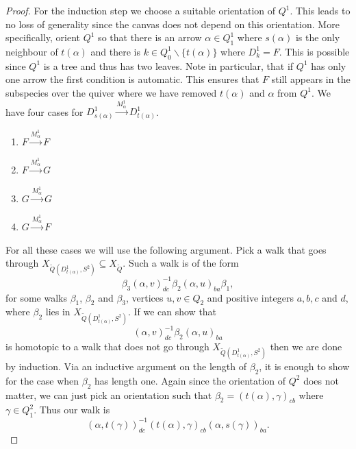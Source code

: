 \documentclass[a4paper, reqno]{amsart}
\theoremstyle{definition}
\begin{document}
\begin{proof}
	For the induction step we choose a suitable orientation of $Q^1$. This leads to no loss of generality since the canvas does not depend on this orientation. More specifically, orient $Q^1$ so that there is an arrow $\alpha\in Q^1_1$ where $s(\alpha)$ is the only neighbour of $t(\alpha)$ and there is $k\in Q_0^1\backslash \{t(\alpha)\}$ where $D_k^1 = F$. This is possible since $Q^1$ is a tree and thus has two leaves. Note in particular, that if $Q^1$ has only one arrow the first condition is automatic. This ensures that $F$ still appears in the subspecies over the quiver where we have removed $t(\alpha)$ and $\alpha$ from $Q^1$. We have four cases for $D_{s(\alpha)}^1\xrightarrow{M_\alpha^1}D_{t(\alpha)}^1$.
	\begin{enumerate}[label=(\alph*)]
		\item $F\xrightarrow{M_\alpha^1}F$
		\item $F\xrightarrow{M_\alpha^1}G$
		\item $G\xrightarrow{M_\alpha^1}G$
		\item $G\xrightarrow{M_\alpha^1}F$
	\end{enumerate}
	For all these cases we will use the following argument. Pick a walk that goes through $X_{\tilde{Q}(D_{t(\alpha)}^1, S^2)}\subseteq X_{\tilde{Q}}$. Such a walk is of the form
	\begin{equation*}
		\beta_3(\alpha, v)_{dc}^{-1} \beta_2 (\alpha, u)_{ba}\beta_1,
	\end{equation*}
	for some walks $\beta_1$, $\beta_2$ and $\beta_3$, vertices $u,v\in Q_2$ and positive integers $a,b,c$ and $d$, where $\beta_2$ lies in $X_{\tilde{Q}(D^1_{t(\alpha)}, S^2)}$. If we can show that
	\begin{equation*}
		(\alpha, v)_{dc}^{-1} \beta_2 (\alpha, u)_{ba}
	\end{equation*}
	is homotopic to a walk that does not go through $X_{\tilde{Q}(D_{t(\alpha)}^1, S^2)}$ then we are done by induction. Via an inductive argument on the length of $\beta_2$, it is enough to show for the case when $\beta_2$ has length one. Again since the orientation of $Q^2$ does not matter, we can just pick an orientation such that $\beta_2 = (t(\alpha), \gamma)_{cb}$ where $\gamma\in Q^2_1$. Thus our walk is
	\begin{equation*}
		(\alpha, t(\gamma))^{-1}_{dc}(t(\alpha), \gamma)_{cb} (\alpha, s(\gamma))_{ba}.
	\end{equation*}


\end{proof}
\end{document}
